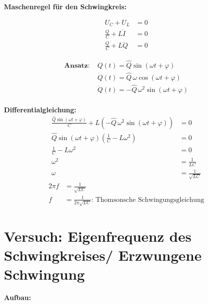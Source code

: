 \documentclass{article}
\begin{document}
	\noindent
	\textbf{Maschenregel für den Schwingkreis:}\\
	\begin{minipage}[t]{0.3\textwidth}
		\begin{align*}
			U_C + U_L &= 0\\
			\frac{Q}{C} + L \dot{I} &= 0\\
			\frac{Q}{C} + L \ddot{Q} &= 0
		\end{align*}
	\end{minipage}
	\hfill
	\begin{minipage}[t]{0.7\textwidth}
		\begin{align*}
			\textbf{Ansatz: } &Q(t) = \hat{Q} \sin (\omega t + \varphi)\\
				       &\dot{Q}(t) = \hat{Q} \,\omega \cos(\omega t + \varphi)\\
				       &\ddot{Q}(t) = -\hat{Q} \,\omega^2 \sin(\omega t + \varphi)\\
		\end{align*}
	\end{minipage}
	
	\vspace{0.5cm}
	\noindent
	\textbf{Differentialgleichung:}
	\begin{align*}
		\frac{\hat{Q} \sin(\omega t + \varphi)}{C} + L \left(-\hat{Q}\,\omega^2 \sin(\omega t + \varphi)\right) &= 0\\
		\hat{Q} \sin(\omega t + \varphi) \left( \frac{1}{C} - L \omega^2 \right) &= 0\\
		\frac{1}{C} - L \omega^2 &= 0\\
		\omega^2 &= \frac{1}{LC}\\
		\omega &= \frac{1}{\sqrt{LC}}
	\end{align*}
	\begin{align*}
		2 \pi f &= \frac{1}{\sqrt{L C}}\\
		f &= \frac{1}{2 \pi \sqrt{L C}} \text{: Thomsonsche Schwingungsgleichung}
	\end{align*}

	\newpage
	\section*{Versuch: Eigenfrequenz des Schwingkreises/ Erzwungene Schwingung}
	\textbf{Aufbau:}\\
	
\end{document}
